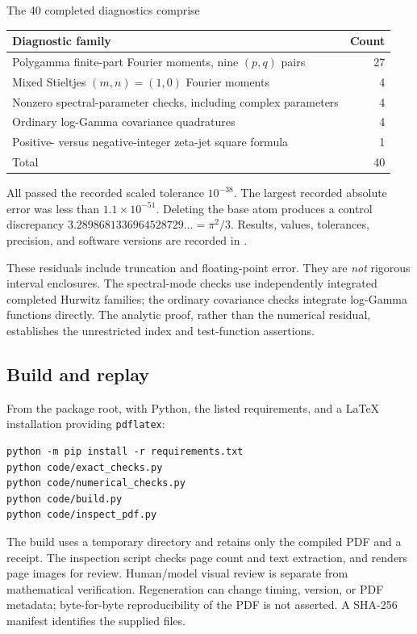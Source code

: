 \documentclass[11pt,a4paper]{article}
\numberwithin{equation}{section}
\theoremstyle{definition}
\newcommand{\src}[1]{\texttt{\detokenize{#1}}}
\begin{document}
The 40 completed diagnostics comprise
\begin{center}
\begin{tabular}{@{}lr@{}}
\toprule
Diagnostic family & Count\\
\midrule
Polygamma finite-part Fourier moments, nine $(p,q)$ pairs & 27\\
Mixed Stieltjes $(m,n)=(1,0)$ Fourier moments & 4\\
Nonzero spectral-parameter checks, including complex parameters & 4\\
Ordinary log-Gamma covariance quadratures & 4\\
Positive- versus negative-integer zeta-jet square formula & 1\\
\midrule
Total & 40\\
\bottomrule
\end{tabular}
\end{center}
All passed the recorded scaled tolerance $10^{-38}$. The largest recorded absolute error was less than $1.1\times10^{-51}$. Deleting the base atom produces a control discrepancy $3.2898681336964528729\ldots=\pi^2/3$. Results, values, tolerances, precision, and software versions are recorded in \src{data/numerical_checks.json}.

These residuals include truncation and floating-point error. They are \emph{not} rigorous interval enclosures. The spectral-mode checks use independently integrated completed Hurwitz families; the ordinary covariance checks integrate log-Gamma functions directly. The analytic proof, rather than the numerical residual, establishes the unrestricted index and test-function assertions.

\subsection{Build and replay}
From the package root, with Python, the listed requirements, and a LaTeX installation providing \texttt{pdflatex}:
\begin{verbatim}
python -m pip install -r requirements.txt
python code/exact_checks.py
python code/numerical_checks.py
python code/build.py
python code/inspect_pdf.py
\end{verbatim}
The build uses a temporary directory and retains only the compiled PDF and a receipt. The inspection script checks page count and text extraction, and renders page images for review. Human/model visual review is separate from mathematical verification. Regeneration can change timing, version, or PDF metadata; byte-for-byte reproducibility of the PDF is not asserted. A SHA-256 manifest identifies the supplied files.
\end{document}
